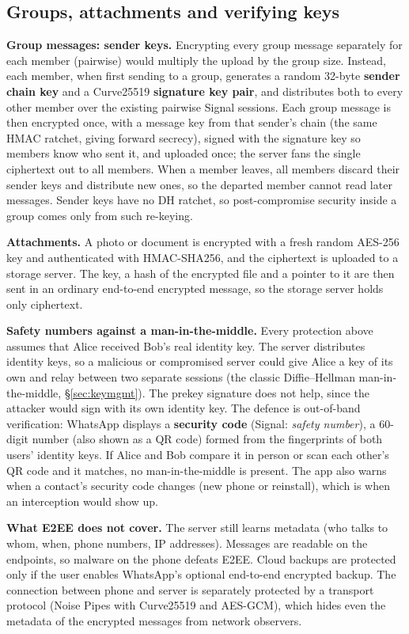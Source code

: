 \subsection{Groups, attachments and verifying keys}
\textbf{Group messages: sender keys.} Encrypting every group message separately for each member (pairwise) would multiply the upload by the group size. Instead, each member, when first sending to a group, generates a random 32-byte \textbf{sender chain key} and a Curve25519 \textbf{signature key pair}, and distributes both to every other member over the existing pairwise Signal sessions. Each group message is then encrypted once, with a message key from that sender's chain (the same HMAC ratchet, giving forward secrecy), signed with the signature key so members know who sent it, and uploaded once; the server fans the single ciphertext out to all members. When a member leaves, all members discard their sender keys and distribute new ones, so the departed member cannot read later messages. Sender keys have no DH ratchet, so post-compromise security inside a group comes only from such re-keying.

\textbf{Attachments.} A photo or document is encrypted with a fresh random AES-256 key and authenticated with HMAC-SHA256, and the ciphertext is uploaded to a storage server. The key, a hash of the encrypted file and a pointer to it are then sent in an ordinary end-to-end encrypted message, so the storage server holds only ciphertext.

\textbf{Safety numbers against a man-in-the-middle.} Every protection above assumes that Alice received Bob's real identity key. The server distributes identity keys, so a malicious or compromised server could give Alice a key of its own and relay between two separate sessions (the classic Diffie--Hellman man-in-the-middle, \S\ref{sec:keymgmt}). The prekey signature does not help, since the attacker would sign with its own identity key. The defence is out-of-band verification: WhatsApp displays a \textbf{security code} (Signal: \emph{safety number}), a 60-digit number (also shown as a QR code) formed from the fingerprints of both users' identity keys. If Alice and Bob compare it in person or scan each other's QR code and it matches, no man-in-the-middle is present. The app also warns when a contact's security code changes (new phone or reinstall), which is when an interception would show up.

\textbf{What E2EE does not cover.} The server still learns metadata (who talks to whom, when, phone numbers, IP addresses). Messages are readable on the endpoints, so malware on the phone defeats E2EE. Cloud backups are protected only if the user enables WhatsApp's optional end-to-end encrypted backup. The connection between phone and server is separately protected by a transport protocol (Noise Pipes with Curve25519 and AES-GCM), which hides even the metadata of the encrypted messages from network observers.

